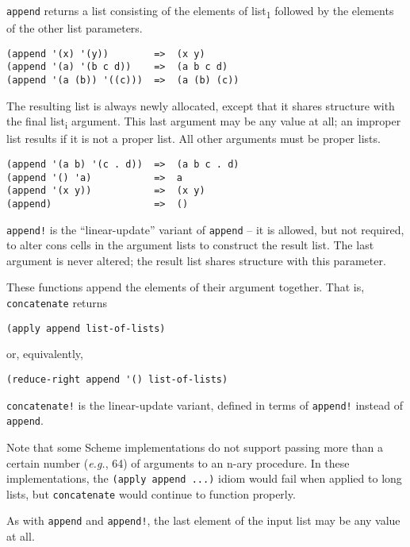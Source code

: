 \begin{entry}{%
  }

  \texttt{append} returns a list consisting of the
  elements of list\textsubscript{1} followed by the elements of the
  other list parameters.

\begin{verbatim}
(append '(x) '(y))        =>  (x y)
(append '(a) '(b c d))    =>  (a b c d)
(append '(a (b)) '((c)))  =>  (a (b) (c))
\end{verbatim}

  The resulting list is always newly allocated, except that it shares
  structure with the final list\textsubscript{i} argument. This last
  argument may be any value at all; an improper list results if it is
  not a proper list. All other arguments must be proper lists.

\begin{verbatim}
(append '(a b) '(c . d))  =>  (a b c . d)
(append '() 'a)           =>  a
(append '(x y))           =>  (x y)
(append)                  =>  ()
\end{verbatim}

  \texttt{append!} is the ``linear-update'' variant of \texttt{append}
  -- it is allowed, but not required, to alter cons cells in the
  argument lists to construct the result list. The last argument is
  never altered; the result list shares structure with this parameter.
\end{entry}

\begin{entry}{%
    }

  These
  functions append the elements of their argument together. That is,
  \texttt{concatenate} returns

\begin{verbatim}
(apply append list-of-lists)
\end{verbatim}

  or, equivalently,

\begin{verbatim}
(reduce-right append '() list-of-lists)
\end{verbatim}

  \texttt{concatenate!} is the linear-update variant, defined in terms
  of \texttt{append!} instead of \texttt{append}.

  Note that some Scheme implementations do not support passing more
  than a certain number (\emph{e.g.}, 64) of arguments to an n-ary
  procedure. In these implementations, the \texttt{(apply\ append\
    ...)} idiom would fail when applied to long lists, but
  \texttt{concatenate} would continue to function properly.

  As with \texttt{append} and \texttt{append!}, the last element of
  the input list may be any value at all.
\end{entry}

